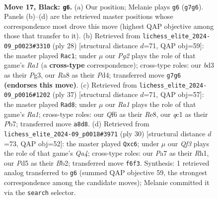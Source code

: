 \documentclass[11pt]{article}
\begin{document}
\clearpage

\begin{figure}[p]\centering
\begin{subfigure}{0.46\textwidth}\centering
\resizebox{\linewidth}{!}{%
\newchessgame
\chessboard[
  setfen={r3r1k1/pp4pp/2nbpq2/3p4/8/N2B2P1/PPP2P1P/R1Q1R1K1 b - - 0 17},
  showmover=false,
  pgfstyle=straightmove, color=movearrow, markmove={g7-g6}
]}
\caption{}
\end{subfigure}\hfill
\begin{subfigure}{0.46\textwidth}\centering
\resizebox{\linewidth}{!}{%
\newchessgame
\chessboard[
  setfen={rn1qr1k1/p4pbp/1pp3p1/3p4/Q2P1B2/6P1/PP2PPNP/R3R1K1 w - - 0 15},
  showmover=false,
  pgfstyle=straightmove, color=movearrow, markmove={a1-c1}
]}
\caption{}
\end{subfigure}
\\[4pt]
\begin{subfigure}{0.46\textwidth}\centering
\resizebox{\linewidth}{!}{%
\newchessgame
\chessboard[
  setfen={r3r1k1/ppq2pbp/6p1/2p4n/P1B1P3/1Q3NPP/1P3PK1/R3R3 b - - 3 19},
  showmover=false,
  pgfstyle=straightmove, color=movearrow, markmove={a8-d8}
]}
\caption{}
\end{subfigure}\hfill
\begin{subfigure}{0.46\textwidth}\centering
\resizebox{\linewidth}{!}{%
\newchessgame
\chessboard[
  setfen={r1bqr1k1/p4ppp/1pp5/3n4/Q7/4PB2/PB1P1PPP/R3K2R w KQ - 0 16},
  showmover=false,
  pgfstyle=straightmove, color=movearrow, markmove={a4-c6}
]}
\caption{}
\end{subfigure}
\caption{\textbf{Move 17, Black: \texttt{g6}.} (a) Our position; Melanie plays \texttt{g6} (\texttt{g7g6}). Panels (b)--(d) are the retrieved master positions whose correspondence most drove this move (highest QAP objective among those that transfer to it). (b) Retrieved from \texttt{lichess\_elite\_2024-09\_p0023\#3310} (ply 28) [structural distance $d$=71, QAP obj=59]: the master played \texttt{Rac1}; under $\mu$ our \emph{Pg2} plays the role of that game's \emph{Ra1} (a \textbf{cross-type} correspondence); cross-type roles: our \emph{b}d3 as their \emph{P}g3, our \emph{R}a8 as their \emph{P}d4; transferred move \texttt{g7g6} \textbf{(endorses this move)}. (c) Retrieved from \texttt{lichess\_elite\_2024-09\_p0016\#1202} (ply 37) [structural distance $d$=71, QAP obj=57]: the master played \texttt{Rad8}; under $\mu$ our \emph{Ra1} plays the role of that game's \emph{Ra1}; cross-type roles: our \emph{Q}f6 as their \emph{R}e8, our \emph{q}c1 as their \emph{P}b7; transferred move \texttt{a8d8}. (d) Retrieved from \texttt{lichess\_elite\_2024-09\_p0018\#3971} (ply 30) [structural distance $d$=73, QAP obj=52]: the master played \texttt{Qxc6}; under $\mu$ our \emph{Qf3} plays the role of that game's \emph{Qa4}; cross-type roles: our \emph{P}a7 as their \emph{R}h1, our \emph{P}d5 as their \emph{B}b2; transferred move \texttt{f6f3}. Synthesis: 1 retrieved analog transferred to \texttt{g6} (summed QAP objective 59, the strongest correspondence among the candidate moves); Melanie committed it via the \texttt{search} selector.}
\label{fig:thought-m33}
\end{figure}
\end{document}
